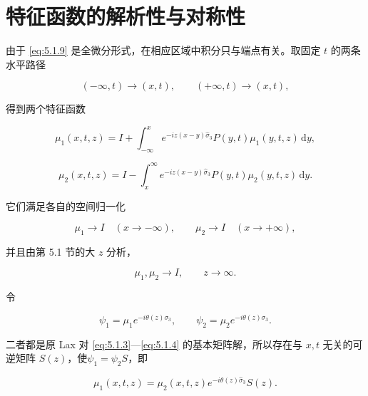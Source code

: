 \documentclass[
    lang=cn,
    scheme=chinese,
    mode=simple,
    device=normal,
    color=blue,
    math=cm,
    thmcnt=section,
    12pt
]{elegantbook}
\begin{document}
\section{特征函数的解析性与对称性}

由于 \eqref{eq:5.1.9} 是全微分形式，在相应区域中积分只与端点有关。取固定 $t$ 的两条水平路径

\[
    (-\infty,t)\to(x,t),
    \qquad
    (+\infty,t)\to(x,t),
\]

得到两个特征函数

\begin{equation}
    \mu_1(x,t,z)
    =
    I+
    \int_{-\infty}^{x}
    e^{-iz(x-y)\widehat{\sigma}_3}
    P(y,t)\mu_1(y,t,z)\,\mathrm dy,
    \tag{5.2.1}
    \label{eq:5.2.1}
\end{equation}

\begin{equation}
    \mu_2(x,t,z)
    =
    I-
    \int_x^{\infty}
    e^{-iz(x-y)\widehat{\sigma}_3}
    P(y,t)\mu_2(y,t,z)\,\mathrm dy.
    \tag{5.2.2}
    \label{eq:5.2.2}
\end{equation}

它们满足各自的空间归一化

\[
    \mu_1\to I\quad(x\to-\infty),
    \qquad
    \mu_2\to I\quad(x\to+\infty),
\]

并且由第 5.1 节的大 $z$ 分析，

\[
    \mu_1,\mu_2\to I,\qquad z\to\infty.
\]


令

\[
    \psi_1=\mu_1e^{-i\theta(z)\sigma_3},
    \qquad
    \psi_2=\mu_2e^{-i\theta(z)\sigma_3}.
\]

二者都是原 Lax 对 \eqref{eq:5.1.3}---\eqref{eq:5.1.4} 的基本矩阵解，所以存在与 $x,t$ 无关的可逆矩阵 $S(z)$，使$\psi_1=\psi_2S$，即

\begin{equation}
    \mu_1(x,t,z)
    =
    \mu_2(x,t,z)e^{-i\theta(z)\widehat{\sigma}_3}S(z).
    \tag{5.2.3}
    \label{eq:5.2.3}
\end{equation}
\end{document}
